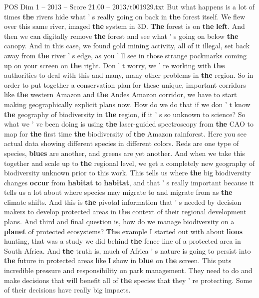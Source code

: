 \begin{textsample}{POS Dim 1 – 2013 – Score 21.00 – 2013/t001929.txt}
But what happens is a lot of times \textbf{the} rivers hide what ' s really going on back in \textbf{the} forest itself.
We flew over this same river, imaged \textbf{the} system in 3D. \textbf{The} forest is on \textbf{the} \textbf{left}.
And then we can digitally remove \textbf{the} forest and see what ' s going on below \textbf{the} canopy.
And in this case, we found gold mining activity, all of it illegal, set back away from \textbf{the} river ' s edge, as you ' ll see in those strange pockmarks coming up on your screen on \textbf{the} right.
Don ' t worry, we ' re working with \textbf{the} authorities to deal with this and many, many other problems in \textbf{the} region.
So in order to put together a conservation plan for these unique, important corridors like \textbf{the} western Amazon and \textbf{the} Andes Amazon corridor, we have to start making geographically explicit plans now.
How do we do that if we don ' t know \textbf{the} geography of biodiversity in \textbf{the} region, if it ' s so unknown to science?
So what we ' ve been doing is using \textbf{the} laser-guided spectroscopy from \textbf{the} CAO to map for \textbf{the} first time \textbf{the} biodiversity of \textbf{the} Amazon rainforest.
Here you see actual data showing different species in different colors.
Reds are one type of species, \textbf{blues} are another, and greens are yet another.
And when we take this together and scale up to \textbf{the} regional level, we get a completely new geography of biodiversity unknown prior to this work.
This tells us where \textbf{the} big biodiversity changes \textbf{occur} from \textbf{habitat} to \textbf{habitat}, and that ' s really important because it tells us a lot about where species may migrate to and migrate from as \textbf{the} climate shifts.
And this is \textbf{the} pivotal information that ' s needed by decision makers to develop protected areas in \textbf{the} context of their regional development plans.
And third and final question is, how do we manage biodiversity on a \textbf{planet} of protected ecosystems? \textbf{The} example I started out with about \textbf{lions} hunting, that was a study we did behind \textbf{the} fence line of a protected area in South Africa.
And \textbf{the} truth is, much of Africa ' s nature is going to persist into \textbf{the} future in protected areas like I show in \textbf{blue} on \textbf{the} screen.
This puts incredible pressure and responsibility on park management.
They need to do and make decisions that will benefit all of \textbf{the} species that they ' re protecting.
Some of their decisions have really big impacts.

\end{textsample}
